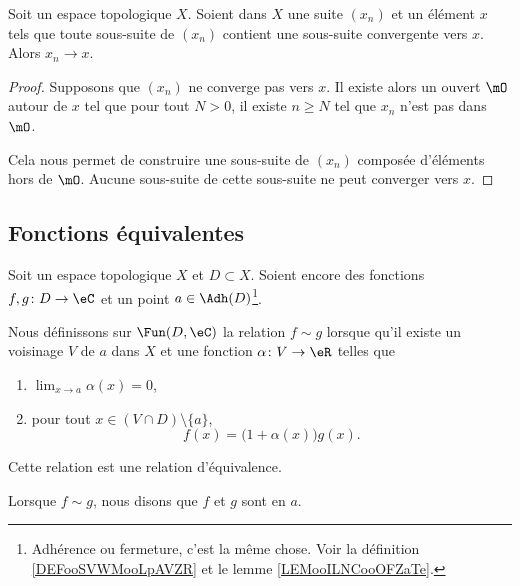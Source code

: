 \begin{lemma}        \label{LEMooSJKMooKSiEGq}
	Soit un espace topologique \( X\). Soient dans \( X\) une suite \( (x_n)\) et un élément \( x\) tels que toute sous-suite de \( (x_n)\) contient une sous-suite convergente vers \( x\). Alors \( x_n\to x\).
\end{lemma}

\begin{proof}
	Supposons que \( (x_n)\) ne converge pas vers \( x\). Il existe alors un ouvert \( \mO\) autour de \( x\) tel que pour tout \( N>0\), il existe \( n\geq N\) tel que \( x_n\) n'est pas dans \( \mO\).

	Cela nous permet de construire une sous-suite de \( (x_n)\) composée d'éléments hors de \( \mO\). Aucune sous-suite de cette sous-suite ne peut converger vers \( x\).
\end{proof}

\subsection{Fonctions équivalentes}

\begin{propositionDef}       \label{DEFooWDSAooKXZsZY}
	Soit un espace topologique \( X\) et \( D\subset X\). Soient encore des fonctions \( f,g\colon D\to \eC\) et un point \( a\in\Adh(D)\)\footnote{Adhérence ou fermeture, c'est la même chose. Voir la définition \ref{DEFooSVWMooLpAVZR} et le lemme \ref{LEMooILNCooOFZaTe}.}.

	Nous définissons sur \( \Fun(D,\eC)\) la relation \( f\sim g\) lorsque qu'il existe un voisinage \( V\) de \( a\) dans \( X\) et une fonction \( \alpha\colon V\to \eR\) telles que
	\begin{enumerate}
		\item
		      \( \lim_{x\to a} \alpha(x)=0\),
		\item
		      pour tout \( x\in (V\cap D)\setminus\{ a \}\),
		      \begin{equation}        \label{EQooQXKYooSDPpNq}
			      f(x)=\big( 1+\alpha(x) \big)g(x).
		      \end{equation}
	\end{enumerate}
	Cette relation est une relation d'équivalence.

	Lorsque \( f\sim g\), nous disons que \( f\) et \( g\) sont  en \( a\).
\end{propositionDef}


